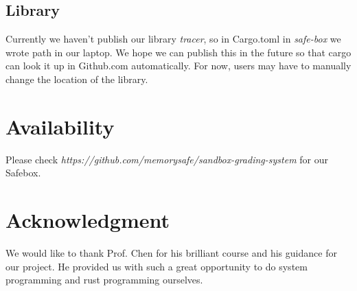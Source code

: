 \documentclass[conference,compsoc]{IEEEtran}
\begin{document}
	\subsection{Library}
		\par
			Currently we haven't publish our library \emph{tracer}, so in Cargo.toml in \emph{safe-box} we wrote path in our laptop.
			We hope we can publish this in the future so that cargo can look it up in Github.com automatically.
			For now, users may have to manually change the location of the library.


\section{Availability}

	Please check \emph{https://github.com/memorysafe/sandbox-grading-system} for our Safebox.

\section*{Acknowledgment}
	We would like to thank Prof. Chen for his brilliant course and his guidance for our project. He provided us with such a great opportunity to do system programming and rust programming ourselves. 





\end{document}
